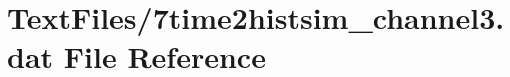 \hypertarget{7time2histsim__channel3_8dat}{}\section{Text\+Files/7time2histsim\+\_\+channel3.dat File Reference}
\label{7time2histsim__channel3_8dat}
